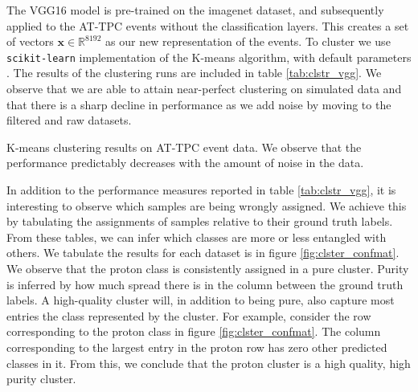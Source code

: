 \documentclass[review,number,sort&compress]{elsarticle}
\newcommand{\R}{\mathbb{R}}
\begin{document}

The VGG16 model is pre-trained on the imagenet dataset, and subsequently applied to the AT-TPC events without the classification layers. This creates a set of vectors $\boldsymbol{x} \in \R^{8192}$ as our new representation of the events. To cluster we use \lstinline{scikit-learn} implementation of the K-means algorithm, with default parameters \cite{Pedregosa2011}. The results of the clustering runs are included in table \ref{tab:clstr_vgg}. We observe that we are able to attain near-perfect clustering on simulated data and that there is a sharp decline in performance as we add noise by moving to the filtered and raw datasets. 


\begin{table}[H]
\centering 
\caption[K-means on pre-trained model]{K-means clustering results on AT-TPC event data. We observe that the performance predictably decreases with the amount of noise in the data.}\label{tab:clstr_vgg}

\end{table}

In addition to the performance measures reported in table \ref{tab:clstr_vgg}, it is interesting to observe which samples are being wrongly assigned. We achieve this by tabulating the assignments of samples relative to their ground truth labels. From these tables, we can infer which classes are more or less entangled with others. We tabulate the results for each dataset is in figure \ref{fig:clster_confmat}. We observe that the proton class is consistently assigned in a pure cluster. Purity is inferred by how much spread there is in the column between the ground truth labels. A high-quality cluster will, in addition to being pure, also capture most entries the class represented by the cluster. For example, consider the row corresponding to the proton class in figure \ref{fig:clster_confmat}. The column corresponding to the largest entry in the proton row has zero other predicted classes in it. From this, we conclude that the proton cluster is a high quality, high purity cluster. 
\end{document}
